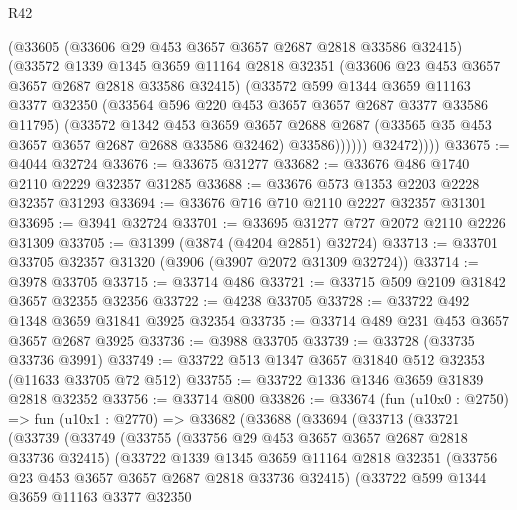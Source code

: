 \begin{lexlean}{R42}
\begin{coremodule}
                (@33605
                  (@33606 @29 @453 @3657 @3657 @2687 @2818 @33586 @32415)
                  (@33572
                    @1339
                    @1345
                    @3659
                    @11164
                    @2818
                    @32351
                    (@33606 @23 @453 @3657 @3657 @2687 @2818 @33586 @32415)
                    (@33572
                      @599
                      @1344
                      @3659
                      @11163
                      @3377
                      @32350
                      (@33564 @596 @220 @453 @3657 @3657 @2687 @3377 @33586 @11795)
                      (@33572
                        @1342
                        @453
                        @3659
                        @3657
                        @2688
                        @2687
                        (@33565 @35 @453 @3657 @3657 @2687 @2688 @33586 @32462)
                        @33586))))))
            @32472))))
@33675 := @4044 @32724
@33676 := @33675 @31277
@33682 := @33676 @486 @1740 @2110 @2229 @32357 @31285
@33688 := @33676 @573 @1353 @2203 @2228 @32357 @31293
@33694 := @33676 @716 @710 @2110 @2227 @32357 @31301
@33695 := @3941 @32724
@33701 := @33695 @31277 @727 @2072 @2110 @2226 @31309
@33705 := @31399 (@3874 (@4204 @2851) @32724)
@33713 := @33701 @33705 @32357 @31320 (@3906 (@3907 @2072 @31309 @32724))
@33714 := @3978 @33705
@33715 := @33714 @486
@33721 := @33715 @509 @2109 @31842 @3657 @32355 @32356
@33722 := @4238 @33705
@33728 := @33722 @492 @1348 @3659 @31841 @3925 @32354
@33735 := @33714 @489 @231 @453 @3657 @3657 @2687 @3925
@33736 := @3988 @33705
@33739 := @33728 (@33735 @33736 @3991)
@33749 := @33722 @513 @1347 @3657 @31840 @512 @32353 (@11633 @33705 @72 @512)
@33755 := @33722 @1336 @1346 @3659 @31839 @2818 @32352
@33756 := @33714 @800
@33826 := @33674
    (fun (u10x0 : @2750) =>
    fun (u10x1 : @2770) =>
    @33682
      (@33688
        (@33694
          (@33713
            (@33721
              (@33739
                (@33749
                  (@33755
                    (@33756 @29 @453 @3657 @3657 @2687 @2818 @33736 @32415)
                    (@33722
                      @1339
                      @1345
                      @3659
                      @11164
                      @2818
                      @32351
                      (@33756 @23 @453 @3657 @3657 @2687 @2818 @33736 @32415)
                      (@33722
                        @599
                        @1344
                        @3659
                        @11163
                        @3377
                        @32350

\end{coremodule}
\end{lexlean}
